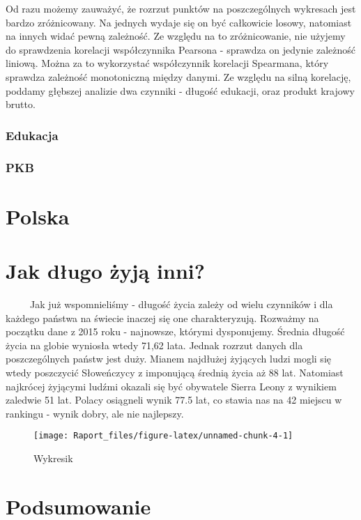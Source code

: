 \documentclass[
]{article}
\begin{document}
Od razu możemy zauważyć, że rozrzut punktów na poszczególnych wykresach
jest bardzo zróżnicowany. Na jednych wydaje się on być całkowicie
losowy, natomiast na innych widać pewną zależność. Ze względu na to
zróżnicowanie, nie użyjemy do sprawdzenia korelacji współczynnika
Pearsona - sprawdza on jedynie zależność liniową. Można za to
wykorzystać współczynnik korelacji Spearmana, który sprawdza zależność
monotoniczną między danymi. Ze względu na silną korelację, poddamy
głębszej analizie dwa czynniki - długość edukacji, oraz produkt krajowy
brutto.

\hypertarget{edukacja}{%
\subsubsection{Edukacja}\label{edukacja}}

\hypertarget{pkb}{%
\subsubsection{PKB}\label{pkb}}

\hypertarget{polska}{%
\section{Polska}\label{polska}}

\hypertarget{jak-dux142ugo-ux17cyjux105-inni}{%
\section{Jak długo żyją inni?}\label{jak-dux142ugo-ux17cyjux105-inni}}

~~~~~Jak już wspomnieliśmy - długość życia zależy od wielu czynników i
dla każdego państwa na świecie inaczej się one charakteryzują. Rozważmy
na początku dane z 2015 roku - najnowsze, którymi dysponujemy. Średnia
długość życia na globie wyniosła wtedy 71,62 lata. Jednak rozrzut danych
dla poszczególnych państw jest duży. Mianem najdłużej żyjących ludzi
mogli się wtedy poszczycić Słoweńczycy z imponującą średnią życia aż 88
lat. Natomiast najkrócej żyjącymi ludźmi okazali się być obywatele
Sierra Leony z wynikiem zaledwie 51 lat. Polacy osiągneli wynik 77.5
lat, co stawia nas na 42 miejscu w rankingu - wynik dobry, ale nie
najlepszy.

\begin{figure}[H]

\begin{center}\texttt{[image: Raport\_files/figure-latex/unnamed-chunk-4-1]} \end{center}
\caption{Wykresik}
\end{figure}

\hypertarget{podsumowanie}{%
\section{Podsumowanie}\label{podsumowanie}}
\end{document}
